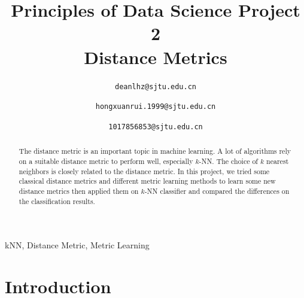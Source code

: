 \documentclass[conference]{IEEEtran}
\begin{document}


\title{Principles of Data Science Project 2\\
Distance Metrics}

\author{
\texttt{deanlhz@sjtu.edu.cn}
\and
{}
\texttt{hongxuanrui.1999@sjtu.edu.cn}
\and
{}
\texttt{1017856853@sjtu.edu.cn}
}

\maketitle

\begin{abstract}
The distance metric is an important topic in machine learning. A lot of algorithms rely on a suitable distance metric to perform well, especially $k$-NN. The choice of $k$ nearest neighbors is
closely related to the distance metric. In this project, we tried some classical distance metrics and different metric learning methods to learn some new distance metrics then applied them on $k$-NN classifier and compared the differences
on the classification results.
\end{abstract}

\begin{IEEEkeywords}
kNN, Distance Metric, Metric Learning
\end{IEEEkeywords}

\section{Introduction}
\end{document}
